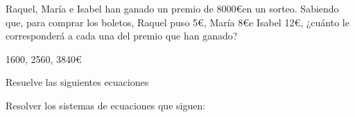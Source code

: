 \documentclass[addpoints,spanish, 12pt,a4paper]{exam}
\begin{document}
\begin{questions}
\question [2] Raquel, María e Isabel han ganado un premio de 8000\euro en un sorteo. Sabiendo que, para comprar los boletos, Raquel puso 5\euro, María 8\euro e Isabel 12\euro, ¿cuánto le corresponderá a cada una del premio que han ganado?
\begin{solution}
1600, 2560, 3840\euro
\end{solution}


\question Resuelve las siguientes ecuaciones

\question Resolver los sistemas de ecuaciones que siguen:
\end{questions}
\end{document}

